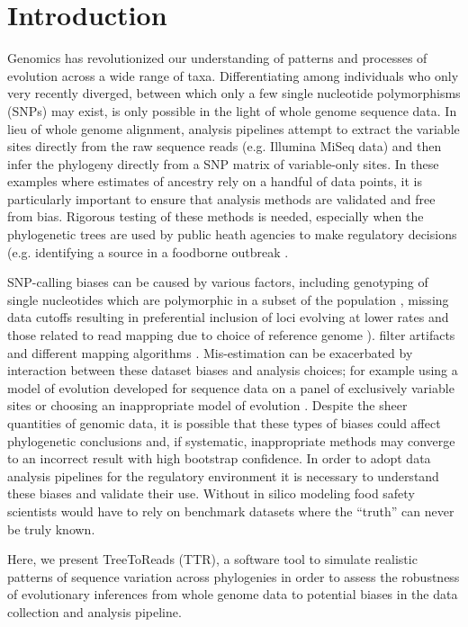 \section{Introduction}
Genomics has revolutionized our understanding of patterns and processes of evolution across a wide range of taxa. 
Differentiating among individuals who only very recently diverged, between which only a few single nucleotide polymorphisms (SNPs) may exist, 
is only possible in the light of whole genome sequence data. 
In lieu of whole genome alignment, analysis pipelines attempt to extract the variable sites directly from the raw sequence reads (e.g. Illumina MiSeq data) 
and then infer the phylogeny directly from a SNP matrix of variable-only sites. In these examples where estimates of ancestry rely on a handful of data points, 
it is particularly important to ensure that analysis methods are validated and free from bias. Rigorous testing of these methods is needed,
especially when the phylogenetic trees are used by public heath agencies to make regulatory decisions (e.g. identifying a source in a foodborne outbreak \citep{hoffmann_tracing_2015}. 

SNP-calling biases can be caused by various factors, 
including genotyping of single nucleotides which are polymorphic in a subset of the population \citep{mctavish_how_2015}, 
missing data cutoffs resulting in preferential inclusion of loci evolving at lower rates \citep{huang_unforeseen_2014} and those related to read mapping due to choice of reference genome \citep{bertels_automated_2014}). 
filter artifacts \citep{li_toward_2014} and different mapping algorithms \citep{pightling_choice_2014}. 
Mis-estimation can be exacerbated by interaction between these dataset biases and analysis choices; 
for example using a model of evolution developed for sequence data on a panel of exclusively variable sites \citep{lewis_likelihood_2001} 
or choosing an inappropriate model of evolution \citep{sullivan_are_1997}. Despite the sheer quantities of genomic data, 
it is possible that these types of biases could affect phylogenetic conclusions and, if systematic, inappropriate methods may converge to an incorrect result with high bootstrap confidence. 
In order to adopt data analysis pipelines for the regulatory environment it is necessary to understand these biases and validate their use. 
Without in silico modeling food safety scientists would have to rely on benchmark datasets where the “truth” can never be truly known.


Here, we present TreeToReads (TTR), a software tool to simulate realistic patterns of sequence variation across phylogenies 
in order to assess the robustness of evolutionary inferences from whole genome data to potential biases in the data collection and analysis pipeline. 

